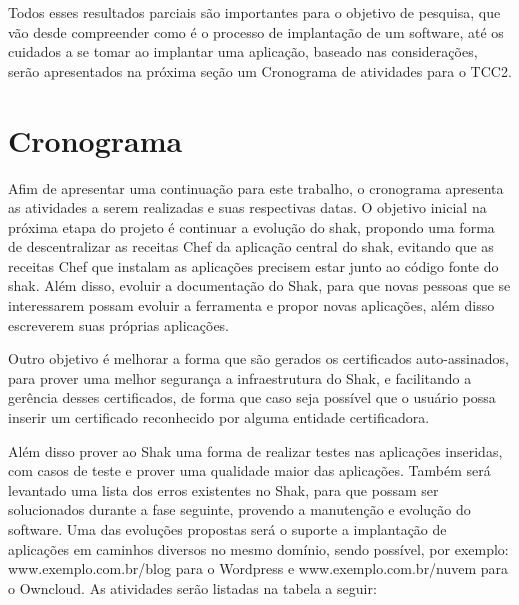 Todos esses resultados parciais são importantes para o objetivo de pesquisa, que vão
desde compreender como é o processo de implantação de um software, até os cuidados
a se tomar ao implantar uma aplicação, baseado nas considerações, serão apresentados
na próxima seção um Cronograma de atividades para o TCC2.


\section{Cronograma}
%

Afim de apresentar uma continuação para este trabalho, o cronograma apresenta as
atividades a serem realizadas e suas respectivas datas.
O objetivo inicial na próxima etapa do projeto é continuar a evolução do shak,
propondo uma forma de descentralizar as receitas Chef da aplicação central do shak,
evitando que as receitas Chef que instalam as aplicações precisem estar junto ao
código fonte do shak. Além disso, evoluir a documentação do Shak, para que novas
pessoas que se interessarem possam evoluir a ferramenta e propor novas aplicações,
além disso escreverem suas próprias aplicações.

Outro objetivo é melhorar a forma que são gerados os certificados auto-assinados,
para prover uma melhor segurança a infraestrutura do Shak, e facilitando a gerência
desses certificados, de forma que caso seja possível que o usuário possa inserir um certificado
reconhecido por alguma entidade certificadora.

Além disso prover ao Shak uma forma de realizar testes nas aplicações inseridas,
com casos de teste e prover uma qualidade maior das aplicações. Também será levantado
uma lista dos erros existentes no Shak, para que possam ser solucionados durante
a fase seguinte, provendo a manutenção e evolução do software. Uma das evoluções
propostas será o suporte a implantação de aplicações em caminhos diversos no mesmo
domínio, sendo possível, por exemplo: www.exemplo.com.br/blog para o Wordpress e
www.exemplo.com.br/nuvem para o Owncloud. As atividades serão listadas na tabela
a seguir:

